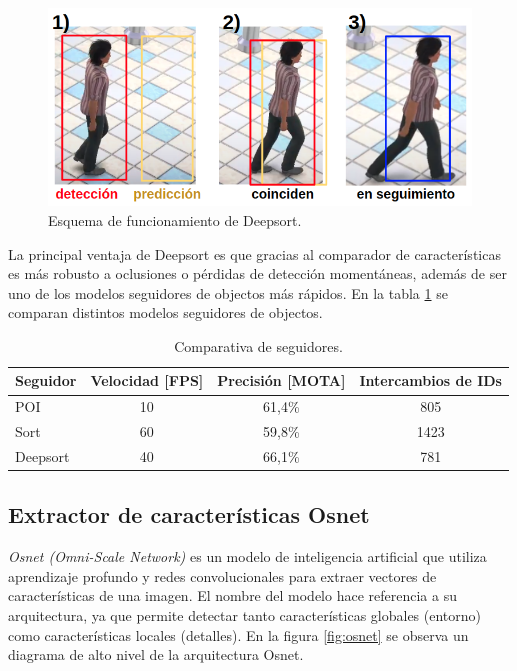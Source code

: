 \begin{figure}[ht]
	\centering
	\includegraphics[scale=.65]{./Figures/deepsortProcess.png}
	\caption{Esquema de funcionamiento de Deepsort.}
	\label{fig:deepsortProcess}
\end{figure}

La principal ventaja de Deepsort es que gracias al comparador de características es más robusto a oclusiones o pérdidas de detección momentáneas, además de ser uno de los modelos seguidores de objectos más rápidos. En la tabla \ref{tab:comparativaSeguidores} se comparan distintos modelos seguidores de objectos.

\begin{table}[h]
	\centering
	\caption[Comparativa de seguidores]{Comparativa de seguidores.}
	\begin{tabular}{l c c c}    
		\toprule
		\textbf{Seguidor} & \textbf{Velocidad [FPS]}  & \textbf{Precisión [MOTA]} & \textbf{Intercambios de IDs} \\
		\midrule
		POI & 10 & 61,4\% & 805 \\
		Sort & 60 & 59,8\% & 1423 \\
		Deepsort & 40 & 66,1\% & 781 \\
		\bottomrule
		\hline
	\end{tabular}
	\label{tab:comparativaSeguidores}
\end{table}

\newpage

\subsection{Extractor de características Osnet}
\label{sec:exactorOsnet}

\textit{Osnet (Omni-Scale Network)} \citep{OSNET} es un modelo de inteligencia artificial que utiliza aprendizaje profundo y redes convolucionales para extraer vectores de características de una imagen. El nombre del modelo hace referencia a su arquitectura, ya que permite detectar tanto características globales (entorno) como características locales (detalles). En la figura \ref{fig:osnet} se observa un diagrama de alto nivel de la arquitectura Osnet.

